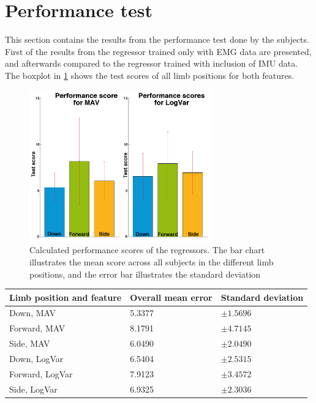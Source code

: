 \section{Performance test}
This section contains the results from the performance test done by the subjects. First of the results from the regressor trained only with EMG data are presented, and afterwards compared to the regressor trained with inclusion of IMU data. The boxplot in \ref{fig:GotItTime} shows the test scores of all limb positions for both features.

\begin{figure}[H]
	\includegraphics[width=0.7\textwidth]{figures/results/GotItTime}  %
	\caption{Calculated performance scores of the regressors. The bar chart illustrates the mean score across all subjects in the different limb positions, and the error bar illustrates the standard deviation}
	\label{fig:GotItTime}  %
\end{figure}

	\begin{center}
		\begin{tabular}{l l l}
			\toprule
			\textbf{Limb position and feature} & \textbf{Overall mean error} & \textbf{Standard deviation}\\
			\midrule
			Down, MAV & 5.3377 & $\pm 1.5696$ \\
			Forward, MAV & 8.1791 & $\pm 4.7145$ \\
			Side, MAV & 6.0490 & $\pm 2.0490$ \\
			Down, LogVar & 6.5404 & $\pm 2.5315$ \\
			Forward, LogVar & 7.9123 & $\pm 3.4572$ \\
			Side, LogVar & 6.9325 & $\pm 2.3036$ \\
			\bottomrule
		\end{tabular}
	\end{center}
	
